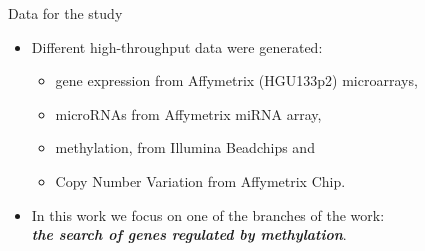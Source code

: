 \documentclass[handout]{beamer}
\begin{document}
\begin{frame}{Data for the study}
  \begin{itemize}
     \item Different high-throughput data were generated:
     \begin{itemize}
       \item gene expression from Affymetrix (HGU133p2) microarrays,
       \item microRNAs from Affymetrix miRNA array,
       \item methylation, from Illumina Beadchips and
       \item Copy Number Variation from Affymetrix Chip.
     \end{itemize}

    \item In this work we focus on one of the branches of the work: \\
        \textbf{\emph{the search of genes regulated by methylation}}.
  \end{itemize}
\end{frame}

\end{document}
